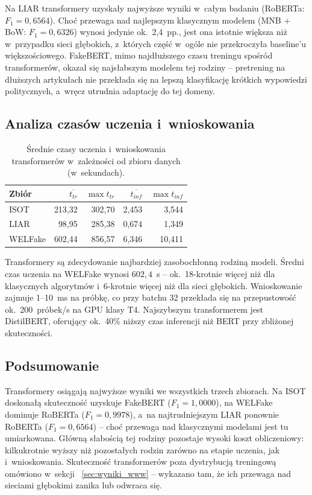\documentclass[oneside,polski,logo]{amuthesis}
\begin{document}
Na LIAR transformery uzyskały najwyższe wyniki w~całym badaniu
(RoBERTa: \(F_1 = 0{,}6564\)). Choć przewaga nad najlepszym
klasycznym modelem (MNB + BoW: \(F_1 = 0{,}6326\)) wynosi jedynie
ok.\ 2{,}4~pp., jest ona istotnie większa niż w~przypadku sieci
głębokich, z~których część w~ogóle nie przekroczyła baseline'u
większościowego. FakeBERT, mimo najdłuższego czasu treningu spośród
transformerów, okazał się najsłabszym modelem tej rodziny --
pretrening na dłuższych artykułach nie przekłada się na lepszą
klasyfikację krótkich wypowiedzi politycznych, a~wręcz utrudnia
adaptację do tej domeny.

\subsection{Analiza czasów uczenia i~wnioskowania}
\label{sec:wyniki_bert_czas}

\begin{table}[ht]
\centering
\caption{Średnie czasy uczenia i~wnioskowania transformerów
w~zależności od zbioru danych (w~sekundach).}
\label{tab:bert_czasy}
\begin{tabular}{lrrrr}
\toprule
Zbiór & $\overline{t_{tr}}$ & $\max{t_{tr}}$ & $\overline{t_{inf}}$ & $\max{t_{inf}}$ \\
\midrule
ISOT    & 213,32 & 302,70 & 2,453 & 3,544  \\
LIAR    &  98,95 & 285,38 & 0,674 & 1,349  \\
WELFake & 602,44 & 856,57 & 6,346 & 10,411 \\
\bottomrule
\end{tabular}
\end{table}

Transformery są zdecydowanie najbardziej zasobochłonną rodziną modeli.
Średni czas uczenia na WELFake wynosi \(602{,}4\)~s -- ok.\ 18-krotnie
więcej niż dla klasycznych algorytmów i~6-krotnie więcej niż dla sieci
głębokich. Wnioskowanie zajmuje 1--10~ms na próbkę, co przy batchu 32
przekłada się na przepustowość ok.\ 200~próbek/s na GPU klasy T4.
Najszybszym transformerem jest DistilBERT, oferujący ok.\ 40\% niższy
czas inferencji niż BERT przy zbliżonej skuteczności.

\subsection{Podsumowanie}
\label{sec:wyniki_bert_podsum}

Transformery osiągają najwyższe wyniki we wszystkich trzech zbiorach.
Na ISOT doskonałą skuteczność uzyskuje FakeBERT (\(F_1 = 1{,}0000\)),
na WELFake dominuje RoBERTa (\(F_1 = 0{,}9978\)), a~na najtrudniejszym
LIAR ponownie RoBERTa (\(F_1 = 0{,}6564\)) -- choć przewaga nad
klasycznymi modelami jest tu umiarkowana. Główną słabością tej rodziny
pozostaje wysoki koszt obliczeniowy: kilkukrotnie wyższy niż pozostałych
rodzin zarówno na etapie uczenia, jak i~wnioskowania. Skuteczność
transformerów poza dystrybucją treningową omówiono w~sekcji~%
\ref{sec:wyniki_www} -- wykazano tam, że ich przewaga nad sieciami
głębokimi zanika lub odwraca się.
\end{document}
